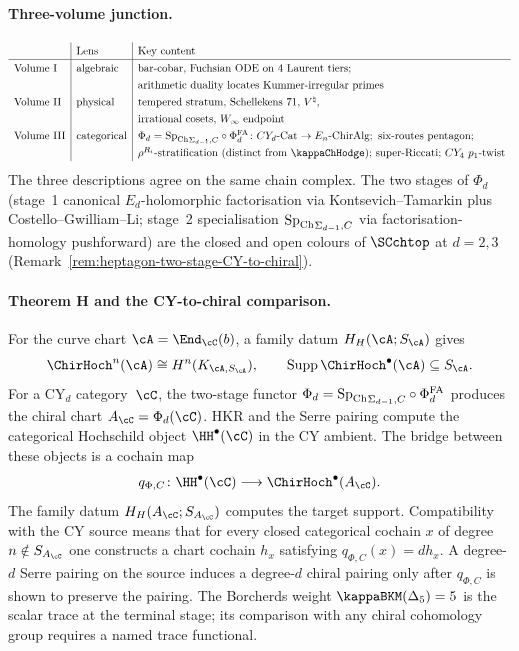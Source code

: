 \paragraph{Three-volume junction.}
\[
\renewcommand{\arraystretch}{1.3}
\begin{array}{l|l|l}
 & \text{Lens} & \text{Key content} \\
\hline
\text{Volume~I} & \text{algebraic} &
 \text{bar-cobar, Fuchsian ODE on 4 Laurent tiers;} \\
 & & \text{arithmetic duality locates Kummer-irregular primes} \\
\text{Volume~II} & \text{physical} &
 \text{tempered stratum, Schellekens 71, } V^\natural, \\
 & & \text{irrational cosets, } W_\infty \text{ endpoint} \\
\text{Volume~III} & \text{categorical} &
 \Phi_d = {\SpCh}_{\Sigma_{d-1},C}\circ\PhiFA_d\colon CY_d\text{-Cat} \to E_n\text{-ChirAlg};
 \text{ six-routes pentagon;} \\
 & & \rho^{R_i}\text{-stratification (distinct from } \kappaChHodge\text{);}
 \text{ super-Riccati; } CY_4\ p_1\text{-twist}
\end{array}
\]
The three descriptions agree on the same chain complex. The two
stages of $\Phi_d$ (stage~1 canonical $E_d$-holomorphic
factorisation via Kontsevich--Tamarkin plus
Costello--Gwilliam--Li; stage~2 specialisation
${\mathrm{Sp}_{\mathrm{Ch}}}_{\Sigma_{d-1},C}$ via factorisation-homology pushforward)
are the closed and open colours of $\SCchtop$ at $d = 2, 3$
(Remark~\ref{rem:heptagon-two-stage-CY-to-chiral}).

\paragraph{Theorem H and the CY-to-chiral comparison.}
For the curve chart $\cA=\End_\cC(b)$, a family datum
$H_H(\cA;S_\cA)$ gives
\[
 \ChirHoch^n(\cA)\cong H^n(K_{\cA,S_\cA}),
 \qquad
 \operatorname{Supp}\ChirHoch^\bullet(\cA)\subseteq S_\cA.
\]
For a CY$_d$ category~$\cC$, the two-stage functor
$\Phi_d={\mathrm{Sp}_{\mathrm{Ch}}}_{\Sigma_{d-1},C}\circ\Phi^{\mathrm{FA}}_d$ produces the chiral
chart $A_\cC=\Phi_d(\cC)$.  HKR and the Serre pairing compute the
categorical Hochschild object $\HH^\bullet(\cC)$ in the CY ambient.
The bridge between these objects is a cochain map
\[
 q_{\Phi,C}\colon
 \HH^\bullet(\cC)\longrightarrow
 \ChirHoch^\bullet(A_\cC).
\]
The family datum $H_H(A_\cC;S_{A_\cC})$ computes the target
support.  Compatibility with the CY source means that for every
closed categorical cochain $x$ of degree $n\notin S_{A_\cC}$ one
constructs a chart cochain $h_x$ satisfying
$q_{\Phi,C}(x)=dh_x$.  A degree-$d$ Serre pairing on the source
induces a degree-$d$ chiral pairing only after $q_{\Phi,C}$ is shown
to preserve the pairing.  The Borcherds weight
$\kappaBKM(\Delta_5)=5$ is the scalar trace at the terminal stage;
its comparison with any chiral cohomology group requires a named
trace functional.

